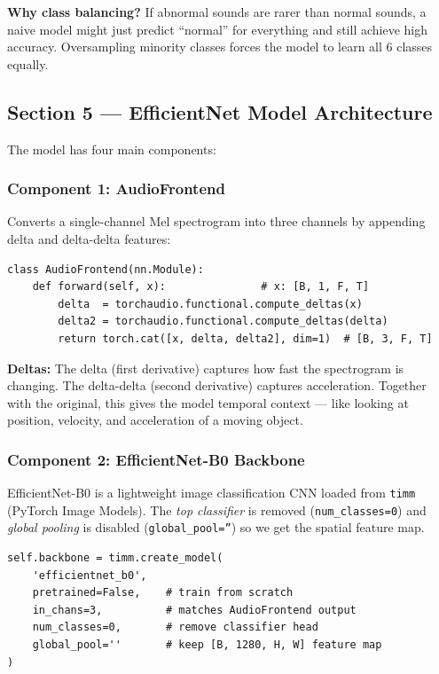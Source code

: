 \documentclass[12pt,a4paper]{article}
\begin{document}
\begin{infobox}
\textbf{Why class balancing?} If abnormal sounds are rarer than normal sounds, a naive model might just predict ``normal'' for everything and still achieve high accuracy. Oversampling minority classes forces the model to learn all 6 classes equally.
\end{infobox}

\subsection{Section 5 --- EfficientNet Model Architecture}

The model has four main components:

\subsubsection{Component 1: AudioFrontend}

Converts a single-channel Mel spectrogram into three channels by appending delta and delta-delta features:

\begin{lstlisting}
class AudioFrontend(nn.Module):
    def forward(self, x):               # x: [B, 1, F, T]
        delta  = torchaudio.functional.compute_deltas(x)
        delta2 = torchaudio.functional.compute_deltas(delta)
        return torch.cat([x, delta, delta2], dim=1)  # [B, 3, F, T]
\end{lstlisting}

\begin{infobox}
\textbf{Deltas:} The delta (first derivative) captures how fast the spectrogram is changing. The delta-delta (second derivative) captures acceleration. Together with the original, this gives the model temporal context --- like looking at position, velocity, and acceleration of a moving object.
\end{infobox}

\subsubsection{Component 2: EfficientNet-B0 Backbone}

EfficientNet-B0 is a lightweight image classification CNN loaded from \texttt{timm} (PyTorch Image Models). The \textit{top classifier} is removed (\texttt{num\_classes=0}) and \textit{global pooling} is disabled (\texttt{global\_pool=''}) so we get the spatial feature map.

\begin{lstlisting}
self.backbone = timm.create_model(
    'efficientnet_b0',
    pretrained=False,    # train from scratch
    in_chans=3,          # matches AudioFrontend output
    num_classes=0,       # remove classifier head
    global_pool=''       # keep [B, 1280, H, W] feature map
)
\end{lstlisting}
\end{document}
